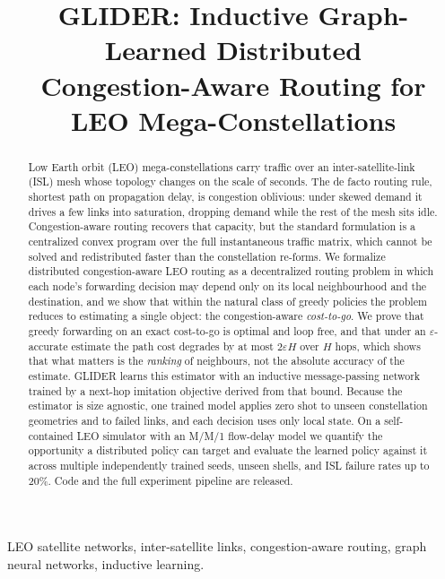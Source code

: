\documentclass[conference]{IEEEtran}
\begin{document}
\title{GLIDER: Inductive Graph-Learned Distributed\\ Congestion-Aware Routing for LEO Mega-Constellations}

\author{
}

\maketitle

\begin{abstract}
Low Earth orbit (LEO) mega-constellations carry traffic over an inter-satellite-link (ISL) mesh whose topology changes on the scale of seconds. The de facto routing rule, shortest path on propagation delay, is congestion oblivious: under skewed demand it drives a few links into saturation, dropping demand while the rest of the mesh sits idle. Congestion-aware routing recovers that capacity, but the standard formulation is a centralized convex program over the full instantaneous traffic matrix, which cannot be solved and redistributed faster than the constellation re-forms. We formalize distributed congestion-aware LEO routing as a decentralized routing problem in which each node's forwarding decision may depend only on its local neighbourhood and the destination, and we show that within the natural class of greedy policies the problem reduces to estimating a single object: the congestion-aware \emph{cost-to-go}. We prove that greedy forwarding on an exact cost-to-go is optimal and loop free, and that under an $\varepsilon$-accurate estimate the path cost degrades by at most $2\varepsilon H$ over $H$ hops, which shows that what matters is the \emph{ranking} of neighbours, not the absolute accuracy of the estimate. GLIDER learns this estimator with an inductive message-passing network trained by a next-hop imitation objective derived from that bound. Because the estimator is size agnostic, one trained model applies zero shot to unseen constellation geometries and to failed links, and each decision uses only local state. On a self-contained LEO simulator with an M/M/1 flow-delay model we quantify the opportunity a distributed policy can target and evaluate the learned policy against it across multiple independently trained seeds, unseen shells, and ISL failure rates up to 20\%. Code and the full experiment pipeline are released.
\end{abstract}

\begin{IEEEkeywords}
LEO satellite networks, inter-satellite links, congestion-aware routing, graph neural networks, inductive learning.
\end{IEEEkeywords}
\end{document}
